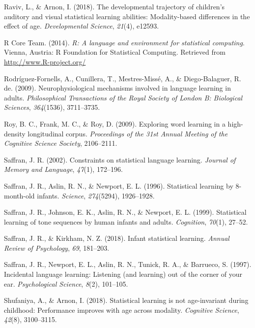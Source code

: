\documentclass[
  english,
  man,mask,floatsintext]{apa6}
\begin{document}
\leavevmode\hypertarget{ref-raviv2018developmental}{}%
Raviv, L., \& Arnon, I. (2018). The developmental trajectory of children's auditory and visual statistical learning abilities: Modality-based differences in the effect of age. \emph{Developmental Science}, \emph{21}(4), e12593.

\leavevmode\hypertarget{ref-R}{}%
R Core Team. (2014). \emph{R: A language and environment for statistical computing}. Vienna, Austria: R Foundation for Statistical Computing. Retrieved from \url{http://www.R-project.org/}

\leavevmode\hypertarget{ref-rodriguez2009neurophysiological}{}%
Rodríguez-Fornells, A., Cunillera, T., Mestres-Missé, A., \& Diego-Balaguer, R. de. (2009). Neurophysiological mechanisms involved in language learning in adults. \emph{Philosophical Transactions of the Royal Society of London B: Biological Sciences}, \emph{364}(1536), 3711--3735.

\leavevmode\hypertarget{ref-roy2009exploring}{}%
Roy, B. C., Frank, M. C., \& Roy, D. (2009). Exploring word learning in a high-density longitudinal corpus. \emph{Proceedings of the 31st Annual Meeting of the Cognitive Science Society}, 2106--2111.

\leavevmode\hypertarget{ref-saffran2002constraints}{}%
Saffran, J. R. (2002). Constraints on statistical language learning. \emph{Journal of Memory and Language}, \emph{47}(1), 172--196.

\leavevmode\hypertarget{ref-saffran1996statistical}{}%
Saffran, J. R., Aslin, R. N., \& Newport, E. L. (1996). Statistical learning by 8-month-old infants. \emph{Science}, \emph{274}(5294), 1926--1928.

\leavevmode\hypertarget{ref-saffran1999statistical}{}%
Saffran, J. R., Johnson, E. K., Aslin, R. N., \& Newport, E. L. (1999). Statistical learning of tone sequences by human infants and adults. \emph{Cognition}, \emph{70}(1), 27--52.

\leavevmode\hypertarget{ref-saffran2018infant}{}%
Saffran, J. R., \& Kirkham, N. Z. (2018). Infant statistical learning. \emph{Annual Review of Psychology}, \emph{69}, 181--203.

\leavevmode\hypertarget{ref-saffran1997incidental}{}%
Saffran, J. R., Newport, E. L., Aslin, R. N., Tunick, R. A., \& Barrueco, S. (1997). Incidental language learning: Listening (and learning) out of the corner of your ear. \emph{Psychological Science}, \emph{8}(2), 101--105.

\leavevmode\hypertarget{ref-shufaniya2018statistical}{}%
Shufaniya, A., \& Arnon, I. (2018). Statistical learning is not age-invariant during childhood: Performance improves with age across modality. \emph{Cognitive Science}, \emph{42}(8), 3100--3115.
\end{document}
